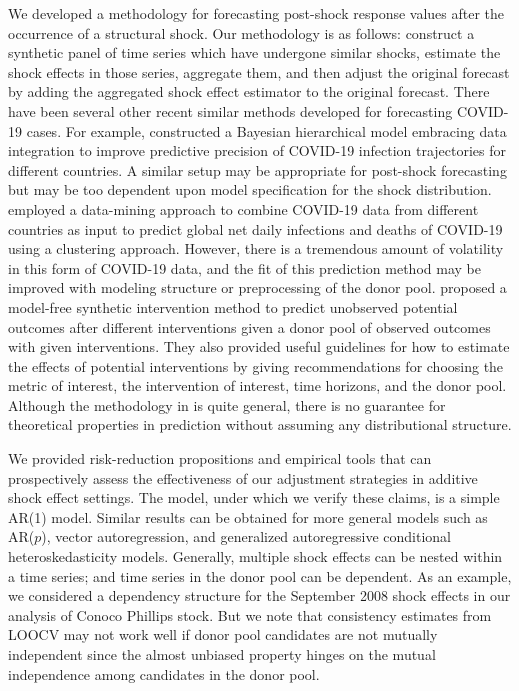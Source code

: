 \documentclass[11pt,3p,review,authoryear]{elsarticle}
\theoremstyle{definition}
\begin{document}
We developed a methodology for forecasting post-shock response values after the occurrence of a structural shock. Our methodology is as follows: construct a synthetic panel of time series which have undergone similar shocks, estimate the shock effects in those series, aggregate them, and then adjust the original forecast by adding the aggregated shock effect estimator to the original forecast. There have been several other recent similar methods developed for forecasting COVID-19 cases. For example, \citet{lee2020estimation} constructed a Bayesian hierarchical model embracing data integration to improve predictive precision of COVID-19 infection trajectories for different countries. A similar setup may be appropriate for post-shock forecasting but may be too dependent upon model specification for the shock distribution. \citet{plessen2020integrated} employed a data-mining approach to combine COVID-19 data from different countries as input to predict global net daily infections and deaths of COVID-19 using a clustering approach. However, there is a tremendous amount of volatility in this form of COVID-19 data, and the fit of this prediction method may be improved with modeling structure or preprocessing of the donor pool. \citet{agarwal2020two} proposed a model-free synthetic intervention method to predict unobserved potential outcomes after different interventions given a donor pool of observed outcomes with given interventions. They also provided useful guidelines for how to estimate the effects of potential interventions by giving recommendations for choosing the metric of interest, the intervention of interest, time horizons, and the donor pool. Although the methodology in \citet{agarwal2020two} is quite general, there is no guarantee for theoretical properties in prediction without assuming any distributional structure. 



We provided risk-reduction propositions and empirical tools that can prospectively assess the effectiveness of our adjustment strategies in additive shock effect settings. The model, under which we verify these claims, is a simple AR(1) model. Similar results can be obtained for more general models such as AR($p$), vector autoregression, and generalized autoregressive conditional heteroskedasticity models. Generally, multiple shock effects can be nested within a time series; and time series in the donor pool can be dependent. As an example, we  considered a dependency structure for the September 2008 shock effects in our analysis of Conoco Phillips stock. But we note that consistency estimates from LOOCV may not work well if donor pool candidates are not mutually independent since the almost unbiased property hinges on the mutual independence among candidates in the donor pool.
\end{document}
